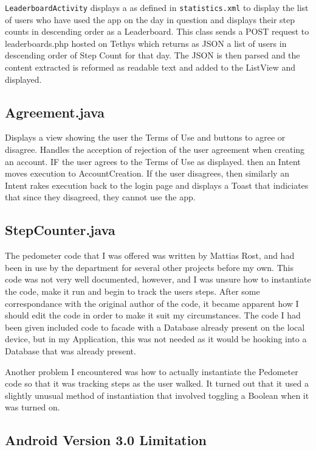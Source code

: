 \documentclass{l4proj}
\begin{document}
\texttt{LeaderboardActivity} displays a \texttt{} as defined in \texttt{statistics.xml} to display the list of users who have used the app on the day in question and displays their step counts in descending order as a Leaderboard. This class sends a POST request to leaderboards.php hosted on Tethys which returns as JSON a list of users in descending order of Step Count for that day. The JSON is then parsed and the content extracted is reformed as readable text and added to the ListView and displayed.

\subsection{Agreement.java}
 
Displays a view showing the user the Terms of Use and buttons to agree or disagree. Handles the acception of rejection of the user agreement when creating an account. IF the user agrees to the Terms of Use as displayed. then an Intent moves execution to AccountCreation. If the user disagrees, then similarly an Intent rakes execution back to the login page and displays a Toast that indiciates that since they disagreed, they cannot use the app.

\subsection{StepCounter.java}

The pedometer code that I was offered was written by Mattias Rost, and had been in use by the department for several other projects before my own. This code was not very well documented, however, and I was unsure how to instantiate the code, make it run and begin to track the users steps.  After some correspondance with the original author of the code, it became apparent how I should edit the code in order to make it suit my circumstances. The code I had been given included code to facade with a Database already present on the local device, but in my Application, this was not needed as it would be hooking into a Database that was already present.

Another problem I encountered was how to actually instantiate the Pedometer code so that it was tracking steps as the user walked. It turned out that it used a slightly unusual method of instantiation that involved toggling a Boolean when it was turned on.

\subsection{Android Version 3.0 Limitation}
\end{document}
